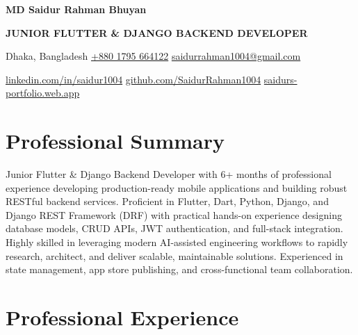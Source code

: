 \documentclass[10.5pt, a4paper]{article}
\newcommand{\sep}{\hspace{0.7em}{\color{crule}\textbullet}\hspace{0.7em}}
\begin{document}

\begin{center}
  {\Huge\bfseries\color{cnavy} MD Saidur Rahman Bhuyan}

  \vspace{5pt}

  {\Large\bfseries\color{csteel} JUNIOR FLUTTER \& DJANGO BACKEND DEVELOPER}

  \vspace{10pt}

  {\normalsize
    Dhaka, Bangladesh
    \sep
    \href{https://wa.me/8801795664122}{+880 1795 664122}
    \sep
    \href{mailto:saidurrahman1004@gmail.com}{saidurrahman1004@gmail.com}
  }

  \vspace{5pt}

  {\normalsize
    \href{https://www.linkedin.com/in/saidur1004/}{linkedin.com/in/saidur1004}
    \sep
    \href{https://github.com/SaidurRahman1004}{github.com/SaidurRahman1004}
    \sep
    \href{https://saidurs-portfolio.web.app}{saidurs-portfolio.web.app}
  }
\end{center}

\vspace{6pt}

\section{Professional Summary}

{\small
Junior Flutter \& Django Backend Developer with 6+ months of professional experience developing production-ready mobile applications and building robust RESTful backend services. Proficient in Flutter, Dart, Python, Django, and Django REST Framework (DRF) with practical hands-on experience designing database models, CRUD APIs, JWT authentication, and full-stack integration. Highly skilled in leveraging modern AI-assisted engineering workflows to rapidly research, architect, and deliver scalable, maintainable solutions. Experienced in state management, app store publishing, and cross-functional team collaboration.
}

\section{Professional Experience}
\end{document}
